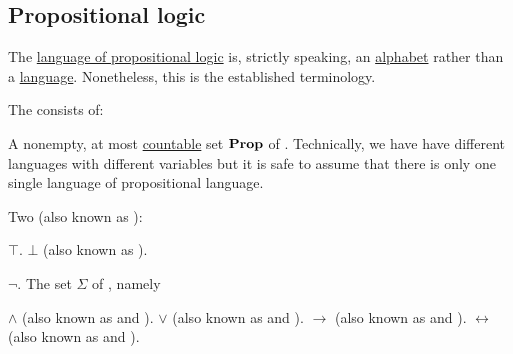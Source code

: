 \subsection{Propositional logic}\label{subsec:propositional_logic}

\begin{remark}\label{rem:propositional_language_is_alphabet}
  The \hyperref[def:propositional_language]{language of propositional logic} is, strictly speaking, an \hyperref[def:language/alphabet]{alphabet} rather than a \hyperref[def:language/language]{language}. Nonetheless, this is the established terminology.
\end{remark}

\begin{definition}\label{def:propositional_language}
  The  consists of:

  \begin{thmenum}
     A nonempty, at most \hyperref[rem:cardinals/countably_infinite]{countable} set \( \operatorname{\mathbf{Prop}} \) of . Technically, we have have different languages with different variables but it is safe to assume that there is only one single language of propositional language.

     Two  (also known as ):
    \begin{thmenum}
        \( \top \).
        \( \bot \) (also known as ).
    \end{thmenum}

      \( \neg \).
     The set \( \Sigma \) of , namely
    \begin{thmenum}
        \( \wedge \) (also known as \hyperref[def:standard_boolean_operators]{} and \hyperref[def:lattice_operations]{}).
        \( \vee \) (also known as \hyperref[def:standard_boolean_operators]{} and \hyperref[def:lattice_operations]{}).
        \( \rightarrow \) (also known as  and \hyperref[def:material_implication]{}).
        \( \leftrightarrow \) (also known as  and ).
    \end{thmenum}


\end{thmenum}
\end{definition}
